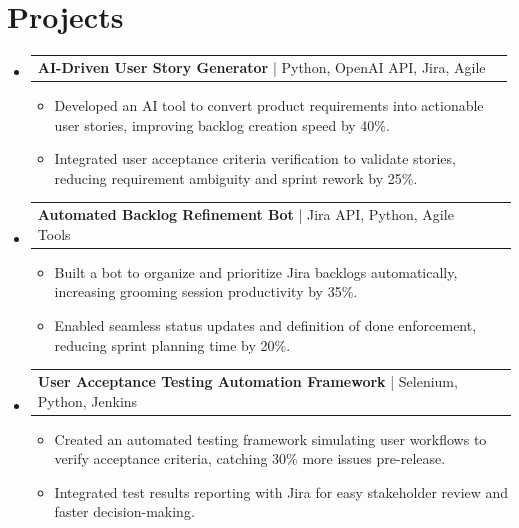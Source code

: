 \documentclass[letterpaper,11pt]{article}
\makeatletter
\newcommand{\resumeItem}[1]{
  \item\footnotesize{
    {#1 \vspace{-2pt}}
  }
}
\newcommand{\resumeProjectHeading}[2]{
    \item
    \begin{tabular*}{1.001\textwidth}{l@{\extracolsep{\fill}}r}
      \small#1 & \textbf{\small #2}\\
    \end{tabular*}\vspace{-7pt}
}
\newcommand{\resumeSubHeadingListStart}{\begin{itemize}[leftmargin=0pt, label={}]}
\newcommand{\resumeSubHeadingListEnd}{\end{itemize}}
\newcommand{\resumeItemListStart}{\begin{itemize}[leftmargin=*]}
\newcommand{\resumeItemListEnd}{\end{itemize}\vspace{-5pt}}
\makeatother
\begin{document}
\section{Projects}
    \vspace{-5pt}
    \resumeSubHeadingListStart
      \resumeProjectHeading
          {\textbf{AI-Driven User Story Generator} | Python, OpenAI API, Jira, Agile}{}
          \resumeItemListStart
              \resumeItem{Developed an AI tool to convert product requirements into actionable user stories, improving backlog creation speed by 40\%.}
              \resumeItem{Integrated user acceptance criteria verification to validate stories, reducing requirement ambiguity and sprint rework by 25\%.}
          \resumeItemListEnd
          \vspace{-12pt}
      \resumeProjectHeading
          {\textbf{Automated Backlog Refinement Bot} | Jira API, Python, Agile Tools}{}
          \resumeItemListStart
              \resumeItem{Built a bot to organize and prioritize Jira backlogs automatically, increasing grooming session productivity by 35\%.}
              \resumeItem{Enabled seamless status updates and definition of done enforcement, reducing sprint planning time by 20\%.}
          \resumeItemListEnd
          \vspace{-12pt}
      \resumeProjectHeading
          {\textbf{User Acceptance Testing Automation Framework} | Selenium, Python, Jenkins}{}
          \resumeItemListStart
              \resumeItem{Created an automated testing framework simulating user workflows to verify acceptance criteria, catching 30\% more issues pre-release.}
              \resumeItem{Integrated test results reporting with Jira for easy stakeholder review and faster decision-making.}
          \resumeItemListEnd
    \resumeSubHeadingListEnd
\end{document}
